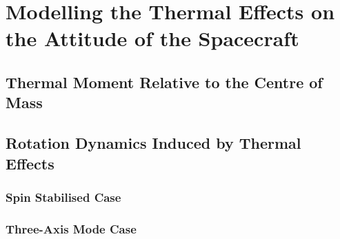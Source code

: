 %
%
%


\chapter{Modelling the Thermal Effects on the Attitude of the Spacecraft}
\label{chp:Thermal_attitude}



\section{Thermal Moment Relative to the Centre of Mass}
\label{subsec:thermal_moment}

\lipsum



\section{Rotation Dynamics Induced by Thermal Effects}
\label{subsec:thermal_rotation}

\lipsum




\subsection{Spin Stabilised Case}
\label{subsec:spinsatibised_case}

\lipsum



\subsection{Three-Axis Mode Case}
\label{subsec:threeaxis_case}

\lipsum





